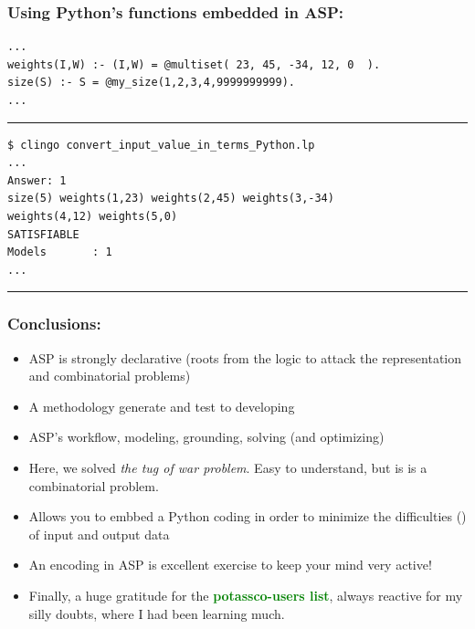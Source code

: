 \documentclass{beamer}
\begin{document}
\begin{frame} [fragile]
\frametitle{Using Python's functions embedded in ASP:}
	
{\small
\begin{verbatim}
...
weights(I,W) :- (I,W) = @multiset( 23, 45, -34, 12, 0  ).
size(S) :- S = @my_size(1,2,3,4,9999999999).
...
\end{verbatim}
}
\textcolor{red}{\rule{\textwidth}{1.7pt} } 

{\small
\begin{verbatim}
$ clingo convert_input_value_in_terms_Python.lp
...
Answer: 1
size(5) weights(1,23) weights(2,45) weights(3,-34) 
weights(4,12) weights(5,0)
SATISFIABLE
Models       : 1
...
\end{verbatim}
}	
\textcolor{red}{\rule{\textwidth}{1.7pt} } 
\end{frame}


\begin{frame}[fragile] 
	\frametitle{Conclusions:}
	
\begin{block}{}
\begin{itemize}

  \item ASP is strongly declarative (roots from the logic to attack the  representation and combinatorial problems)
  
  \item A methodology generate and test to developing
    
  \item ASP's workflow, modeling, grounding, solving
    (and optimizing)
  \item Here, we solved \emph{the tug of war problem}. Easy to understand, but is is a combinatorial problem.
  
  \item Allows you to embbed a Python coding in order to minimize the difficulties (\Smiley) of input and output data
		
   \item An encoding in ASP is excellent exercise to keep your mind very active!

	\item Finally, a huge gratitude for the \textcolor{green}{\textbf{potassco-users list}}, always reactive for my silly doubts,  where I had been learning much.
		
	\end{itemize}
\end{block}
\end{frame}
\end{document}
